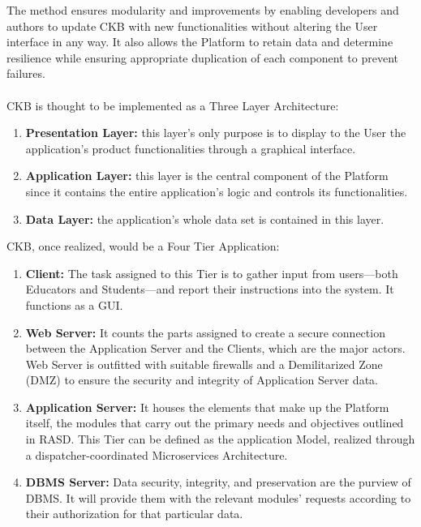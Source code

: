 The method ensures modularity and improvements by enabling developers and authors to update CKB with new functionalities without altering the User interface in any way. It also allows the Platform to retain data and determine 
resilience while ensuring appropriate duplication of each component to prevent failures.\\
\\
CKB is thought to be implemented as a Three Layer Architecture:
\begin{enumerate}[label=$\bullet$]
    \item \textbf{Presentation Layer:} this layer's only purpose is to display to the User the application's product functionalities through a graphical interface.
    \item \textbf{Application Layer:} this layer is the central component of the Platform since it contains the entire application's logic and controls its functionalities.
    \item \textbf{Data Layer:} the application's whole data set is contained in this layer.
\end{enumerate}
CKB, once realized, would be a Four Tier Application:
\begin{enumerate}
    \item \textbf{Client:} The task assigned to this Tier is to gather input from users—both Educators and Students—and report their instructions into the system. It functions as a GUI.
    \item \textbf{Web Server:} It counts the parts assigned to create a secure connection between the Application Server and the Clients, which are the major actors. Web Server is outfitted with 
    suitable firewalls and a Demilitarized Zone (DMZ) to ensure the security and integrity of Application Server data.
    \item \textbf{Application Server:} It houses the elements that make up the Platform itself, the modules that carry out the primary needs and objectives outlined in RASD. This Tier can be 
    defined as the application Model, realized through a dispatcher-coordinated Microservices Architecture.
    \item \textbf{DBMS Server:} Data security, integrity, and preservation are the purview of DBMS. It will provide them with the relevant modules' requests according to their authorization for that particular data. 
\end{enumerate}

